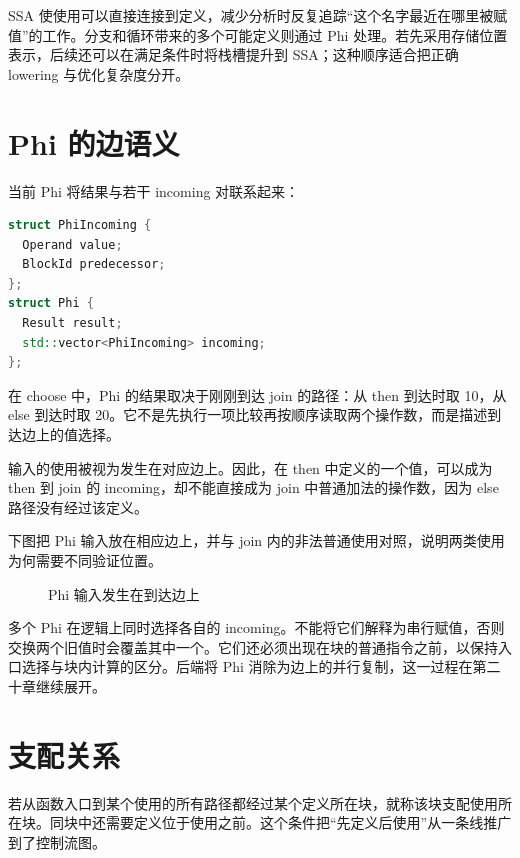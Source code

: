 SSA 使使用可以直接连接到定义，减少分析时反复追踪“这个名字最近在哪里被赋值”的工作。分支和循环带来的多个可能定义则通过 Phi 处理。若先采用存储位置表示，后续还可以在满足条件时将栈槽提升到 SSA；这种顺序适合把正确 lowering 与优化复杂度分开。

\section{Phi 的边语义}
当前 Phi 将结果与若干 incoming 对联系起来：
\begin{lstlisting}[language=C++,caption={当前 Phi 的数据形状}]
struct PhiIncoming {
  Operand value;
  BlockId predecessor;
};
struct Phi {
  Result result;
  std::vector<PhiIncoming> incoming;
};
\end{lstlisting}
在 choose 中，Phi 的结果取决于刚刚到达 join 的路径：从 then 到达时取 10，从 else 到达时取 20。它不是先执行一项比较再按顺序读取两个操作数，而是描述到达边上的值选择。

输入的使用被视为发生在对应边上。因此，在 then 中定义的一个值，可以成为 then 到 join 的 incoming，却不能直接成为 join 中普通加法的操作数，因为 else 路径没有经过该定义。

下图把 Phi 输入放在相应边上，并与 join 内的非法普通使用对照，说明两类使用为何需要不同验证位置。
\begin{figure}[htbp]\centering
{}
\caption{Phi 输入发生在到达边上}
\end{figure}

多个 Phi 在逻辑上同时选择各自的 incoming。不能将它们解释为串行赋值，否则交换两个旧值时会覆盖其中一个。它们还必须出现在块的普通指令之前，以保持入口选择与块内计算的区分。后端将 Phi 消除为边上的并行复制，这一过程在第二十章继续展开。

\section{支配关系}
若从函数入口到某个使用的所有路径都经过某个定义所在块，就称该块支配使用所在块。同块中还需要定义位于使用之前。这个条件把“先定义后使用”从一条线推广到了控制流图。

